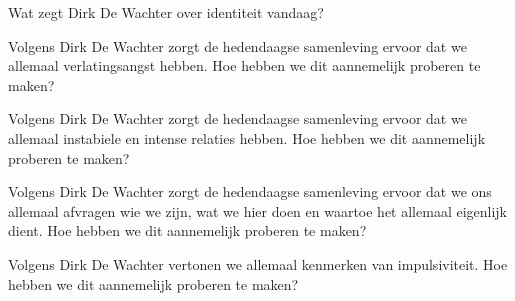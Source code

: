 \documentclass[main.tex]{subfiles}
\begin{document}
\begin{examenvraag}
    \begin{vraag}
        Wat zegt Dirk De Wachter over identiteit vandaag?
    \end{vraag}

    \begin{antwoord}
    \end{antwoord}
\end{examenvraag}


\begin{examenvraag}
    \begin{vraag}
        Volgens Dirk De Wachter zorgt de hedendaagse samenleving ervoor dat we allemaal verlatingsangst hebben. Hoe hebben we dit aannemelijk proberen te maken?
    \end{vraag}

    \begin{antwoord}
    \end{antwoord}
\end{examenvraag}


\begin{examenvraag}
    \begin{vraag}
        Volgens Dirk De Wachter zorgt de hedendaagse samenleving ervoor dat we allemaal instabiele en intense relaties hebben. Hoe hebben we dit aannemelijk proberen te maken?
    \end{vraag}

    \begin{antwoord}
    \end{antwoord}
\end{examenvraag}


\begin{examenvraag}
    \begin{vraag}
        Volgens Dirk De Wachter zorgt de hedendaagse samenleving ervoor dat we ons allemaal afvragen wie we zijn, wat we hier doen en waartoe het allemaal eigenlijk dient. Hoe hebben we dit aannemelijk proberen te maken?
    \end{vraag}

    \begin{antwoord}
    \end{antwoord}
\end{examenvraag}


\begin{examenvraag}
    \begin{vraag}
        Volgens Dirk De Wachter vertonen we allemaal kenmerken van impulsiviteit. Hoe hebben we dit aannemelijk proberen te maken?
    \end{vraag}

    \begin{antwoord}
    \end{antwoord}
\end{examenvraag}
\end{document}
